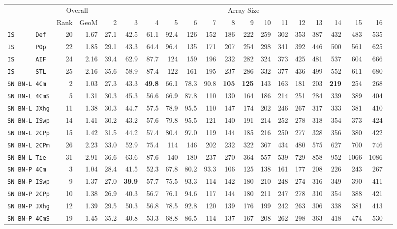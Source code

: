 \begin{tabular}{l | r @{~~} r | r@{~~}r@{~~}r@{~~}r@{~~}r@{~~}r@{~~}r@{~~}r@{~~}r@{~~}r@{~~}r@{~~}r@{~~}r@{~~}r@{~~}r@{~~}r|}
 & \multicolumn{2}{c|}{Overall} & \multicolumn{15}{c}{Array Size} \\
 & Rank & GeoM & 2&3&4&5&6&7&8&9&10&11&12&13&14&15&16\\ \hline
\verb+IS      Def+ & 20 & 1.67 & 27.1&42.5&61.1&92.4&126&152&186&222&259&302&353&387&432&483&535\\
\verb+IS      POp+ & 22 & 1.85 & 29.1&43.3&64.4&96.4&135&171&207&254&298&341&392&446&500&561&625\\
\verb+IS      AIF+ & 24 & 2.16 & 39.4&62.9&87.7&124&159&196&232&282&324&373&425&481&537&604&666\\
\verb+IS      STL+ & 25 & 2.16 & 35.6&58.9&87.4&122&161&195&237&286&332&377&436&499&552&611&680\smallskip \\
\verb+SN BN-L 4Cm + & 2 & 1.03 & 27.3&43.3&\textbf{49.8}&66.1&78.3&90.8&\textbf{105}&\textbf{125}&143&163&181&203&\textbf{219}&254&268\\
\verb+SN BN-L 4CmS+ & 5 & 1.31 & 30.3&45.3&56.6&66.9&87.8&110&130&164&186&214&251&284&339&389&404\\
\verb+SN BN-L JXhg+ & 11 & 1.38 & 30.3&44.7&57.5&78.9&95.5&110&147&174&202&246&267&317&333&381&410\\
\verb+SN BN-L ISwp+ & 14 & 1.41 & 30.2&43.2&57.6&79.8&95.5&121&140&191&214&252&278&318&354&373&424\\
\verb+SN BN-L 2CPp+ & 15 & 1.42 & 31.5&44.2&57.4&80.4&97.0&119&144&185&216&250&277&328&356&380&422\\
\verb+SN BN-L 2CPm+ & 26 & 2.23 & 33.0&52.9&75.4&114&146&202&232&322&367&434&480&575&627&700&746\\
\verb+SN BN-L Tie + & 31 & 2.91 & 36.6&63.6&87.6&140&180&237&270&364&557&539&729&858&952&1066&1086\smallskip \\
\verb+SN BN-P 4Cm + & 3 & 1.04 & 28.4&41.5&52.3&67.8&80.2&93.3&106&125&138&161&177&208&226&243&267\\
\verb+SN BN-P ISwp+ & 9 & 1.37 & 27.0&\textbf{39.9}&57.7&75.5&93.3&114&142&180&210&248&274&316&349&390&411\\
\verb+SN BN-P 2CPp+ & 10 & 1.38 & 26.9&40.3&56.7&76.1&94.6&117&144&180&211&247&278&310&354&388&421\\
\verb+SN BN-P JXhg+ & 12 & 1.39 & 29.5&50.3&56.8&78.5&92.8&120&139&176&199&242&263&306&338&381&413\\
\verb+SN BN-P 4CmS+ & 19 & 1.45 & 35.2&40.8&53.3&68.8&86.5&114&137&167&208&262&298&363&418&474&530\\

\end{tabular}

